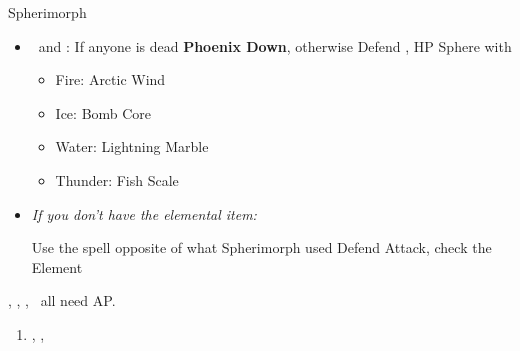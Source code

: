 \bothvfill\winvfill\lossvfill
\begin{battle}[12000]{Spherimorph}
	\begin{itemize}
		\tidusf Change Weapon to Sonic Steel
		\tidusf Defend
		\switch{\tidus}{\rikku}
		\rikkuf Grenade, check the Element
		\item \kimahri\ and \yuna: If anyone is dead \textbf{Phoenix Down}, otherwise Defend
		\rikkuf \od, HP Sphere with
		\begin{itemize}
			\item Fire: Arctic Wind
			\item Ice: Bomb Core
			\item Water: Lightning Marble
			\item Thunder: Fish Scale
		\end{itemize}
		\item \textit{If you don't have the elemental item:}
			\begin{itemize}
				\luluf Use the spell opposite of what Spherimorph used
				\yunaf Defend
				\kimahrif Attack, check the Element
				\rikkuf \od
			\end{itemize}
	\end{itemize}
	\tidus, \yuna, \kimahri, \rikku\ all need AP.
\end{battle}
\begin{enumerate}[resume]
	\item \cs[1:50], \sd, \sd
\end{enumerate}
\colend
